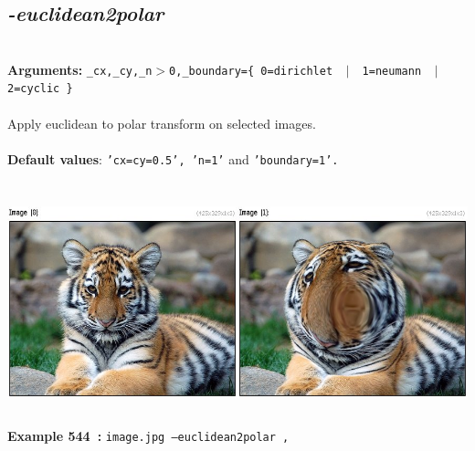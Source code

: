 \documentclass[a4paper,11pt,twoside]{book}
\begin{document}
\subsection{\emph{-euclidean2polar} }\vspace*{-0.5em}
~\\\textbf{Arguments: } 
{\small \texttt{\_cx,\_cy,\_n$>$0,\_boundary=\{ 0=dirichlet ~$|$~ 1=neumann ~$|$~ 2=cyclic \}}}\\~\\
Apply euclidean to polar transform on selected images.
~\\~\\\textbf{Default values}: {\small \texttt{'cx=cy=0.5', 'n=1'} and \texttt{'boundary=1'.}}
\begin{center}\includegraphics[keepaspectratio=true,height=7cm,width=\textwidth]{img/gmic_def544.jpg}\\
{\footnotesize \textbf{Example 544~:} \texttt{image.jpg --euclidean2polar ,}}
\end{center}
\end{document}
